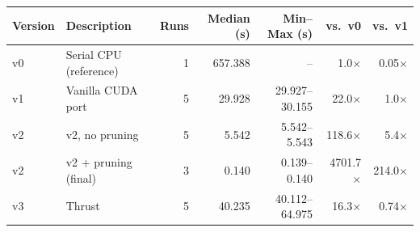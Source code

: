 \begin{tabular}{llrrrrr}
\toprule
Version & Description & Runs & Median (s) & Min--Max (s) & vs.\ v0 & vs.\ v1 \\
\midrule
v0 & Serial CPU (reference) & 1 & 657.388 & -- & 1.0$\times$ & 0.05$\times$ \\
v1 & Vanilla CUDA port & 5 & 29.928 & 29.927--30.155 & 22.0$\times$ & 1.0$\times$ \\
v2 & v2, no pruning & 5 & 5.542 & 5.542--5.543 & 118.6$\times$ & 5.4$\times$ \\
v2 & v2 + pruning (final) & 3 & 0.140 & 0.139--0.140 & 4701.7$\times$ & 214.0$\times$ \\
v3 & Thrust & 5 & 40.235 & 40.112--64.975 & 16.3$\times$ & 0.74$\times$ \\
\bottomrule
\end{tabular}